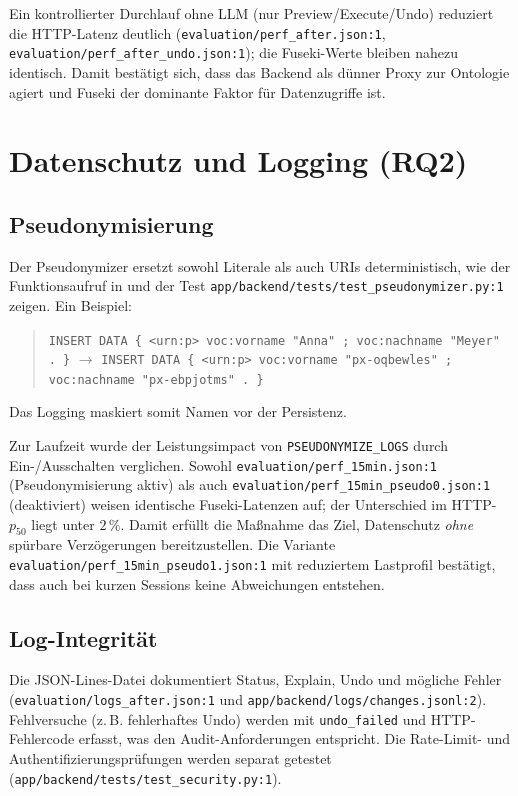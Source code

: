 Ein kontrollierter Durchlauf ohne LLM (nur Preview/Execute/Undo) reduziert die HTTP-Latenz deutlich (\texttt{evaluation/perf\_after.json:1}, \texttt{evaluation/perf\_after\_undo.json:1}); die Fuseki-Werte bleiben nahezu identisch. Damit bestätigt sich, dass das Backend als dünner Proxy zur Ontologie agiert und Fuseki der dominante Faktor für Datenzugriffe ist.

\section{Datenschutz und Logging (RQ2)}

\subsection{Pseudonymisierung}
Der Pseudonymizer ersetzt sowohl Literale als auch URIs deterministisch, wie der Funktionsaufruf in  und der Test \texttt{app/backend/tests/test\_pseudonymizer.py:1} zeigen. Ein Beispiel:
\begin{quote}
\texttt{INSERT DATA \{ <urn:p> voc:vorname "Anna" ; voc:nachname "Meyer" . \}} 
\quad$\rightarrow$\quad
\texttt{INSERT DATA \{ <urn:p> voc:vorname "px-oqbewles" ; voc:nachname "px-ebpjotms" . \}}
\end{quote}
Das Logging maskiert somit Namen vor der Persistenz.

Zur Laufzeit wurde der Leistungsimpact von \texttt{PSEUDONYMIZE\_LOGS} durch Ein-/Ausschalten verglichen. Sowohl \texttt{evaluation/perf\_15min.json:1} (Pseudonymisierung aktiv) als auch \texttt{evaluation/perf\_15min\_pseudo0.json:1} (deaktiviert) weisen identische Fuseki-Latenzen auf; der Unterschied im HTTP-$p_{50}$ liegt unter $2\,\%$. Damit erfüllt die Maßnahme das Ziel, Datenschutz \emph{ohne} spürbare Verzögerungen bereitzustellen. Die Variante \texttt{evaluation/perf\_15min\_pseudo1.json:1} mit reduziertem Lastprofil bestätigt, dass auch bei kurzen Sessions keine Abweichungen entstehen.

\subsection{Log-Integrität}
Die JSON-Lines-Datei dokumentiert Status, Explain, Undo und mögliche Fehler (\texttt{evaluation/logs\_after.json:1} und \texttt{app/backend/logs/changes.jsonl:2}). Fehlversuche (z.\,B. fehlerhaftes Undo) werden mit \texttt{undo\_failed} und HTTP-Fehlercode erfasst, was den Audit-Anforderungen entspricht. Die Rate-Limit- und Authentifizierungsprüfungen werden separat getestet (\texttt{app/backend/tests/test\_security.py:1}).

